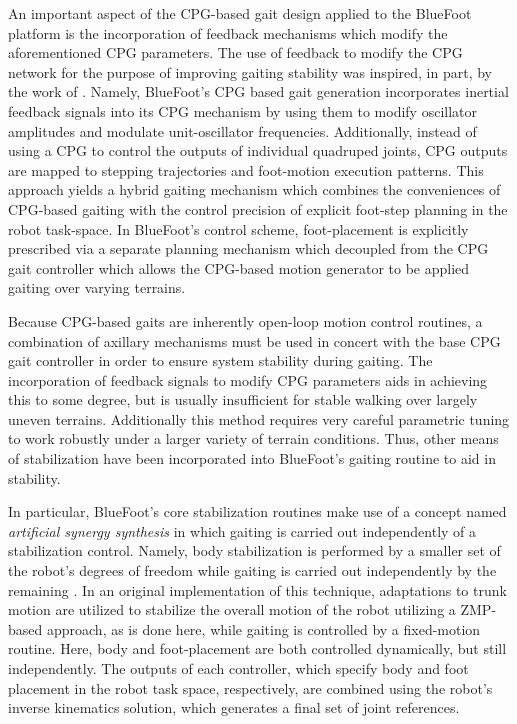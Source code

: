 		An important aspect of the CPG-based gait design applied to the BlueFoot platform is the incorporation of feedback mechanisms which modify the aforementioned CPG parameters. The use of feedback to modify the CPG network for the purpose of improving gaiting stability was inspired, in part, by the work of \cite{Fukuoka2003,Endo2004}. Namely, BlueFoot's CPG based gait generation incorporates inertial feedback signals into its CPG mechanism by using them to modify oscillator amplitudes and modulate unit-oscillator frequencies. Additionally, instead of using a CPG to control the outputs of individual quadruped joints, CPG outputs are mapped to stepping trajectories and foot-motion execution patterns. This approach yields a hybrid gaiting mechanism which combines the conveniences of CPG-based gaiting with the control precision of explicit foot-step planning in the robot task-space. In BlueFoot's control scheme, foot-placement is explicitly prescribed via a separate planning mechanism which decoupled from the CPG gait controller which allows the CPG-based motion generator to be applied gaiting over varying terrains.

		Because CPG-based gaits are inherently open-loop motion control routines, a combination of axillary mechanisms must be used in concert with the base CPG gait controller in order to ensure system stability during gaiting. The incorporation of feedback signals to modify CPG parameters aids in achieving this to some degree, but is usually insufficient for stable walking over largely uneven terrains.  Additionally this method requires very careful parametric tuning to work robustly under a larger variety of terrain conditions. Thus, other means of stabilization have been incorporated into BlueFoot's gaiting routine to aid in stability. 

		In particular, BlueFoot's core stabilization routines make use of a concept named \emph{artificial synergy synthesis} in which gaiting is carried out independently of a stabilization control. Namely, body stabilization is performed by a smaller set of the robot's degrees of freedom while gaiting is carried out independently by the remaining \cite{Vuko1972,Yamaguchi1993}. In an original implementation of this technique, adaptations to trunk motion are utilized to stabilize the overall motion of the robot utilizing a ZMP-based approach, as is done here, while gaiting is controlled by a fixed-motion routine. Here, body and foot-placement are both controlled dynamically, but still independently. The outputs of each controller, which specify body and foot placement in the robot task space, respectively, are combined using the robot's inverse kinematics solution, which generates a final set of joint references.

